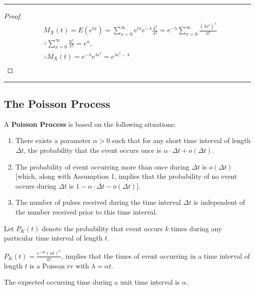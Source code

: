 \noindent\rule{\textwidth}{1pt}

\begin{proof}
    \begin{align*}
        & M_X(t) = E(e^{tx}) = \sum\limits_{x=0}^\infty e^{tx}e^{-\lambda}\frac{\lambda^x}{x!} = e^{-\lambda} \sum\limits_{x=0}^\infty\frac{(\lambda e^t)^x}{x!} \\
        & \because \sum\limits_{x=0}^\infty \frac{u^x}{x!} = e^u, \\
        & \therefore M_X(t) = e^{-\lambda}e^{\lambda e^t} = e^{\lambda e^t - \lambda} \\
    \end{align*}
\end{proof}

\noindent\rule{\textwidth}{1pt}

\subsection{The Poisson Process}

\begin{proposition}
    A \textbf{Poisson Process} is based on the following situations:

    \begin{enumerate}
        \item There exists a parameter $\alpha  > 0$ such that for any short time interval of length $\Delta t$, the probability that the event occurs once is $\alpha \cdot \Delta t + o(\Delta t)$.
        \item The probability of event occurring more than once during $\Delta t$ is $o(\Delta t)$[which, along with Assumption 1, implies that the probability of no event occurs during $\Delta t$ is $1-\alpha\cdot\Delta t - o(\Delta t)$].
        \item The number of pulses received during the time interval $\Delta t$ is independent of the number received prior to this time interval.
    \end{enumerate}

    Let $P_K(t)$ denote the probability that event occurs $k$ times during any particular time interval of length $t$.

    $P_K(t) = \frac{e^{-\alpha t}(\alpha t)^k}{k!}$, implies that the times of event occurring in a time interval of length $t$ is a Poisson rv with $\lambda = \alpha t$. 
    
    The expected occurring time during a unit time interval is $\alpha$.
\end{proposition}